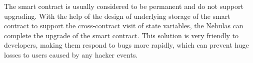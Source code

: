 
The smart contract is usually considered to be permanent and do not support upgrading. With the help of the design of underlying storage of the smart contract to support the cross-contract visit of state variables, the Nebulas can complete the upgrade of the smart contract. This solution is very friendly to developers, making them respond to bugs more rapidly, which can prevent huge losses to users caused by any hacker events.





